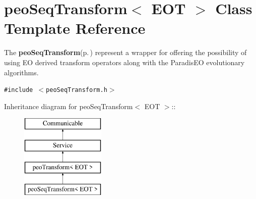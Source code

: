 \section{peo\-Seq\-Transform$<$ EOT $>$ Class Template Reference}
\label{classpeo_seq_transform}
The {\bf peo\-Seq\-Transform}{\rm (p.\,\pageref{classpeo_seq_transform})} represent a wrapper for offering the possibility of using EO derived transform operators along with the Paradis\-EO evolutionary algorithms.  


{\tt \#include $<$peo\-Seq\-Transform.h$>$}

Inheritance diagram for peo\-Seq\-Transform$<$ EOT $>$::\begin{figure}[H]
\begin{center}
\leavevmode
\includegraphics[height=4cm]{classpeo_seq_transform}
\end{center}
\end{figure}
